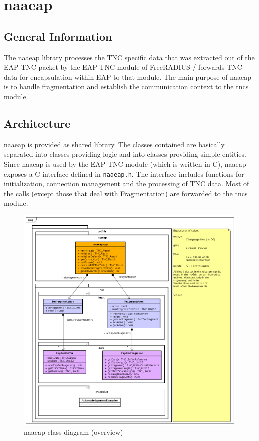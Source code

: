 \documentclass[a4paper,10pt]{scrartcl}
\begin{document}
\section{naaeap}
\subsection{General Information}
The naaeap library processes the TNC specific data that was extracted out of the
EAP-TNC packet by the EAP-TNC module of FreeRADIUS / forwards TNC data for encapsulation
within EAP to that module. The main purpose of naaeap is to handle fragmentation
and establish the communication context to the tncs module.

\subsection{Architecture}
naaeap is provided as shared library. The classes contained are basically separated into
classes providing logic and into classes providing simple entities. Since naaeap
is used by the EAP-TNC module (which is written in C), naaeap exposes a C interface
defined in \texttt{naaeap.h}. The interface includes functions for initialization, connection
management and the processing of TNC data. Most of the calls (except those
that deal with Fragmentation) are forwarded to the tncs module.

\begin{figure}
 \centering
 \includegraphics[width=\textwidth]{design/tncfhh-class-sequence-diagrams-0-6-0/nal-class-0-6-0-light.png}
 \caption{naaeap class diagram (overview)}
 \label{fig:naaeap-overview}
\end{figure}
\end{document}

